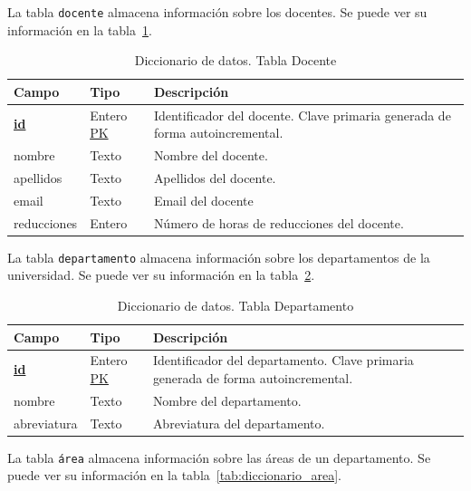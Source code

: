 La tabla \texttt{docente} almacena información sobre los docentes. Se puede ver su información en la tabla~\ref{tab:diccionario_docente}.

\begin{table}
  \centering 
  \begin{tabular}{l p{} p{}}
    \toprule
    \textbf{Campo} & \textbf{Tipo} & \textbf{Descripción}\\
    \midrule
    \textbf{\underline{id}} & Entero \underline{PK} & Identificador del docente. Clave primaria generada de forma autoincremental. \\ \addlinespace
    nombre & Texto & Nombre del docente. \\ \addlinespace
    apellidos & Texto & Apellidos del docente. \\ \addlinespace
    email & Texto & Email del docente \\ \addlinespace
    reducciones & Entero & Número de horas de reducciones del docente. \\
    \bottomrule
  \end{tabular}
  \caption{Diccionario de datos. Tabla Docente}
  \label{tab:diccionario_docente}
\end{table}

La tabla \texttt{departamento} almacena información sobre los departamentos de la universidad. 
Se puede ver su información en la tabla~\ref{tab:diccionario_departamento}.

\begin{table}
  \centering 
  \begin{tabular}{l p{} p{}}
    \toprule
    \textbf{Campo} & \textbf{Tipo} & \textbf{Descripción}\\
    \midrule
    \textbf{\underline{id}} & Entero \underline{PK} & Identificador del departamento. Clave primaria generada de forma autoincremental. \\ \addlinespace
    nombre & Texto & Nombre del departamento. \\ \addlinespace
    abreviatura & Texto & Abreviatura del departamento. \\
    \bottomrule
  \end{tabular}
  \caption{Diccionario de datos. Tabla Departamento}
  \label{tab:diccionario_departamento}
\end{table}

La tabla \texttt{área} almacena información sobre las áreas de un departamento. 
Se puede ver su información en la tabla~\ref{tab:diccionario_area}.

